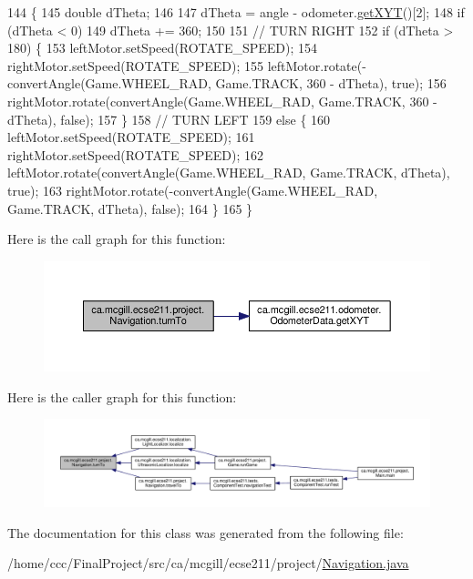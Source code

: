 \begin{DoxyCode}
144                                                 \{
145     \textcolor{keywordtype}{double} dTheta;
146 
147     dTheta = angle - odometer.\hyperlink{classca_1_1mcgill_1_1ecse211_1_1odometer_1_1_odometer_data_a8f40f0264c68f0cbed4fff1723ae7863}{getXYT}()[2];
148     \textcolor{keywordflow}{if} (dTheta < 0)
149       dTheta += 360;
150 
151     \textcolor{comment}{// TURN RIGHT}
152     \textcolor{keywordflow}{if} (dTheta > 180) \{
153       leftMotor.setSpeed(ROTATE\_SPEED);
154       rightMotor.setSpeed(ROTATE\_SPEED);
155       leftMotor.rotate(-convertAngle(Game.WHEEL\_RAD, Game.TRACK, 360 - dTheta), \textcolor{keyword}{true});
156       rightMotor.rotate(convertAngle(Game.WHEEL\_RAD, Game.TRACK, 360 - dTheta), \textcolor{keyword}{false});
157     \}
158     \textcolor{comment}{// TURN LEFT}
159     \textcolor{keywordflow}{else} \{
160       leftMotor.setSpeed(ROTATE\_SPEED);
161       rightMotor.setSpeed(ROTATE\_SPEED);
162       leftMotor.rotate(convertAngle(Game.WHEEL\_RAD, Game.TRACK, dTheta), \textcolor{keyword}{true});
163       rightMotor.rotate(-convertAngle(Game.WHEEL\_RAD, Game.TRACK, dTheta), \textcolor{keyword}{false});
164     \}
165   \}
\end{DoxyCode}
Here is the call graph for this function\+:\nopagebreak
\begin{figure}[H]
\begin{center}
\leavevmode
\includegraphics[width=350pt]{classca_1_1mcgill_1_1ecse211_1_1project_1_1_navigation_a3bbe0645f2b3b3d0986b4a707fb5a00c_cgraph}
\end{center}
\end{figure}
Here is the caller graph for this function\+:\nopagebreak
\begin{figure}[H]
\begin{center}
\leavevmode
\includegraphics[width=350pt]{classca_1_1mcgill_1_1ecse211_1_1project_1_1_navigation_a3bbe0645f2b3b3d0986b4a707fb5a00c_icgraph}
\end{center}
\end{figure}


The documentation for this class was generated from the following file\+:\begin{DoxyCompactItemize}
\item 
/home/ccc/\+Final\+Project/src/ca/mcgill/ecse211/project/\hyperlink{_navigation_8java}{Navigation.\+java}\end{DoxyCompactItemize}
